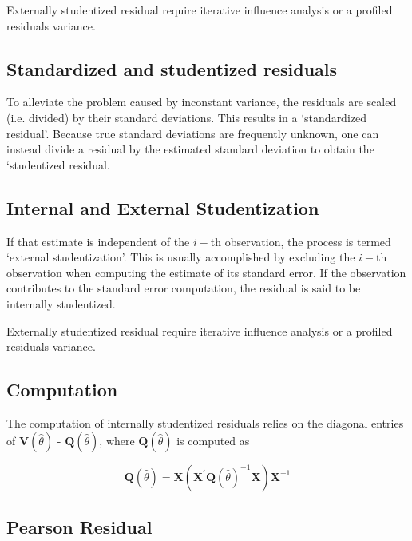 \documentclass[Main.tex]{subfiles}
\begin{document}
Externally  studentized residual require iterative influence analysis or a profiled residuals variance.




	\subsection{Standardized and studentized residuals} %
	
	To alleviate the problem caused by inconstant variance, the residuals are scaled (i.e. divided) by their standard deviations. This results in a `standardized residual'. Because true standard deviations are frequently unknown, one can instead divide a residual by the estimated standard deviation to obtain the `studentized residual. 
	
	
	\subsection{Internal and External Studentization} %
	If that estimate is independent of the $i-$th observation, the process is termed `external studentization'. This is usually accomplished by excluding the $i-$th observation when computing the estimate of its standard error. If the observation contributes to the
	standard error computation, the residual is said to be internally studentized.
	
	Externally  studentized residual require iterative influence analysis or a profiled residuals variance.
	

	\subsection{Computation}%
	
	The computation of internally studentized residuals relies on the diagonal entries of $\boldsymbol{V} (\hat{\theta})$ - $\boldsymbol{Q} (\hat{\theta})$, where $\boldsymbol{Q} (\hat{\theta})$ is computed as
	
	\[ \boldsymbol{Q} (\hat{\theta}) = \boldsymbol{X} ( \boldsymbol{X}^{\prime}\boldsymbol{Q} (\hat{\theta})^{-1}\boldsymbol{X})\boldsymbol{X}^{-1} \]
	
\subsection{Pearson Residual}%
\end{document}
